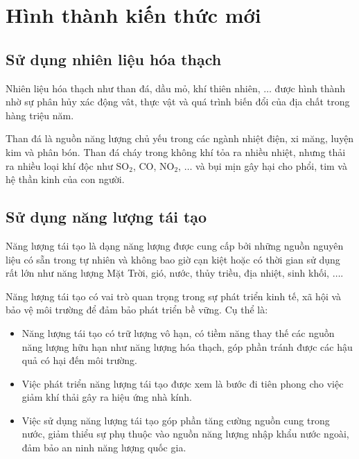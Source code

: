 \setcounter{section}{0}
\section{Hình thành kiến thức mới}
\subsection{Sử dụng nhiên liệu hóa thạch}
Nhiên liệu hóa thạch như than đá, dầu mỏ, khí thiên nhiên, $\ldots$ được hình thành nhờ sự phân hủy xác động vât, thực vật và quá trình biến đổi của địa chất trong hàng triệu năm.

Than đá là nguồn năng lượng chủ yếu trong các ngành nhiệt điện, xi măng, luyện kim và phân bón. Than đá cháy trong không khí tỏa ra nhiều nhiệt, nhưng thải ra nhiều loại khí độc như SO$_2$, CO, NO$_2$, $\ldots$ và bụi mịn gây hại cho phổi, tim và hệ thần kinh của con người.
\subsection{Sử dụng năng lượng tái tạo}
Năng lượng tái tạo là dạng năng lượng được cung cấp bởi những nguồn nguyên liệu có sẵn trong tự nhiên và không bao giờ cạn kiệt hoặc có thời gian sử dụng rất lớn như năng lượng Mặt Trời, gió, nước, thủy triều, địa nhiệt, sinh khối, $\ldots$.

Năng lượng tái tạo có vai trò quan trọng trong sự phát triển kinh tế, xã hội và bảo vệ môi trường để đảm bảo phát triển bề vững. Cụ thể là:
\begin{itemize}
	\item Năng lượng tái tạo có trữ lượng vô hạn, có tiềm năng thay thế các nguồn năng lượng hữu hạn như năng lượng hóa thạch, góp phần tránh được các hậu quả có hại đến môi trường.
	\item Việc phát triển năng lượng tái tạo được xem là bước đi tiên phong cho việc giảm khí thải gây ra hiệu ứng nhà kính.
	\item Việc sử dụng năng lượng tái tạo góp phần tăng cường nguồn cung trong nước, giảm thiểu sự phụ thuộc vào nguồn năng lượng nhập khẩu nước ngoài, đảm bảo an ninh năng lượng quốc gia.
\end{itemize}

